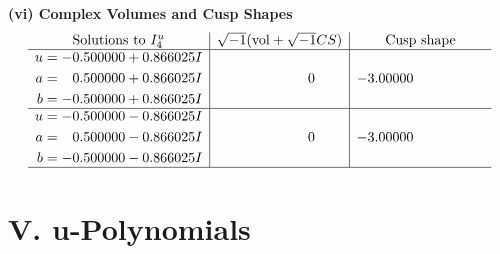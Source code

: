 \documentclass[1p]{elsarticle_modified}
\theoremstyle{definition}
\newcommand{\I}{\sqrt{-1}}
\begin{document}
\newpage\flushleft \textbf{(vi) Complex Volumes and Cusp Shapes}
$$\begin{array}{c|c|c}  
\text{Solutions to }I^u_{4}& \I (\text{vol} + \sqrt{-1}CS) & \text{Cusp shape}\\
 \hline 
\begin{aligned}
u &= -0.500000 + 0.866025 I \\
a &= \phantom{-}0.500000 + 0.866025 I \\
b &= -0.500000 + 0.866025 I\end{aligned}
 & \phantom{-0.000000 } 0 & -3.00000\phantom{ +0.000000I} \\ \hline\begin{aligned}
u &= -0.500000 - 0.866025 I \\
a &= \phantom{-}0.500000 - 0.866025 I \\
b &= -0.500000 - 0.866025 I\end{aligned}
 & \phantom{-0.000000 } 0 & -3.00000\phantom{ +0.000000I}\\
 \hline 
 \end{array}$$\newpage
\newpage\renewcommand{\arraystretch}{1}
\centering \section*{ V. u-Polynomials}
\end{document}

